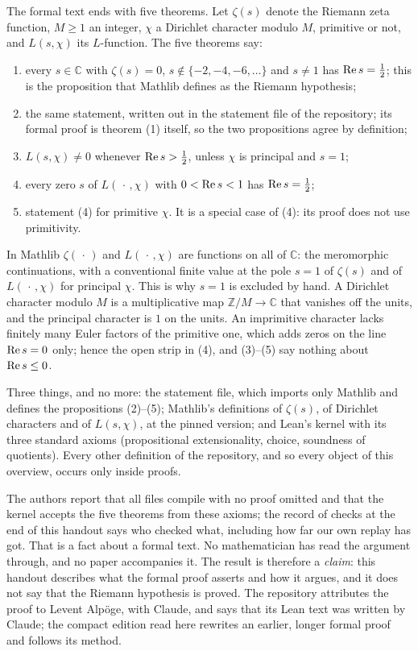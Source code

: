 
The formal text ends with five theorems. Let $\zeta(s)$ denote the Riemann zeta function, $M\ge 1$ an integer, $\chi$ a
Dirichlet character modulo $M$, primitive or not, and $L(s,\chi)$ its $L$-function. The five theorems say:
\begin{enumerate}[label=(\arabic*),leftmargin=2.3em,itemsep=0.05em,topsep=0.15em]
\item every $s\in\mathbb{C}$ with $\zeta(s)=0$, $s\notin\{-2,-4,-6,\dots\}$ and $s\ne 1$ has $\operatorname{Re} s=\tfrac12$; this is
  the proposition that Mathlib defines as the Riemann hypothesis;
\item the same statement, written out in the statement file of the repository; its formal proof is theorem (1)
  itself, so the two propositions agree by definition;
\item $L(s,\chi)\ne 0$ whenever $\operatorname{Re} s>\tfrac12$, unless $\chi$ is principal and $s=1$;
\item every zero $s$ of $L(\,\cdot\,,\chi)$ with $0<\operatorname{Re} s<1$ has $\operatorname{Re} s=\tfrac12$;
\item statement (4) for primitive $\chi$. It is a special case of (4): its proof does not use primitivity.
\end{enumerate}
In Mathlib $\zeta(\,\cdot\,)$ and $L(\,\cdot\,,\chi)$ are functions on all of $\mathbb{C}$: the meromorphic continuations, with a
conventional finite value at the pole $s=1$ of $\zeta(s)$ and of $L(\,\cdot\,,\chi)$ for principal $\chi$. This is why
$s=1$ is excluded by hand. A Dirichlet character modulo $M$ is a multiplicative map
$\mathbb{Z}/M\to\mathbb{C}$ that vanishes off the units, and the principal character is $1$ on the units. An imprimitive
character lacks finitely many Euler factors of the primitive one, which adds zeros on the line $\operatorname{Re} s=0$ only; hence
the open strip in (4), and (3)--(5) say nothing about $\operatorname{Re} s\le 0$.

 Three things, and no more: the statement file, which imports only Mathlib and defines
the propositions (2)--(5); Mathlib's definitions of $\zeta(s)$, of Dirichlet characters and of $L(s,\chi)$, at the pinned
version; and Lean's kernel with its three standard axioms (propositional extensionality, choice, soundness of
quotients). Every other definition of the repository, and so every object of this overview, occurs only inside proofs.

 The authors report that all files compile with no proof omitted and that the kernel accepts the
five theorems from these axioms; the record of checks at the end of this handout says who checked what, including
how far our own replay has got. That is a fact about a formal text. No mathematician has read the argument through, and no paper
accompanies it. The result is therefore a \emph{claim}: this handout describes what the formal proof asserts and
how it argues, and it does not say that the Riemann hypothesis is proved. The repository attributes the proof to Levent
Alpöge, with Claude, and says that its Lean text was written by Claude; the compact edition read here rewrites an
earlier, longer formal proof and follows its method.

